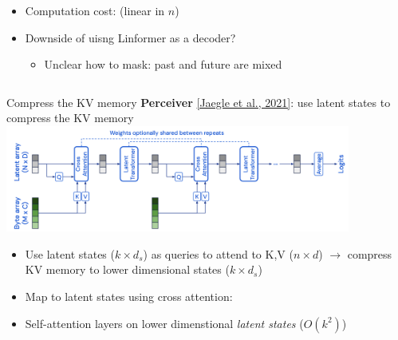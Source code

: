 \documentclass[usenames,dvipsnames,notes,11pt,aspectratio=169,hyperref={colorlinks=true, linkcolor=blue}]{beamer}
\newcommand{\pdfnote}[1]{}
\begin{document}
\begin{frame}
\begin{columns}
\begin{column}{0.7\textwidth}
\begin{itemize}[<+->]
\begin{itemize}
                        \item What's the dimension of the attention matrix?
                            \pdfnote{n x k}
                        \item What's the dimension of the self-attention output?
                            \pdfnote{n x d}
                    \end{itemize}
                \item Computation cost:  (linear in $n$)
                \item Downside of uisng Linformer as a decoder?
                    \begin{itemize}
                        \item Unclear how to mask: past and future are mixed
                    \end{itemize}
            \end{itemize}
        \end{column}
    \end{columns}
\end{frame}

\begin{frame}
    {Compress the KV memory}
    \textbf{Perceiver} \href{https://arxiv.org/pdf/2103.03206.pdf}{[Jaegle et al., 2021]}: use latent states to compress the KV memory \\[1em]

    \includegraphics[height=3.5cm]{figures/perceiver}

    \begin{itemize}[<+->]
        \item Use latent states ($k\times d_s$) as queries to attend to K,V ($n\times d$) $\longrightarrow$ compress KV memory to lower dimensional states ($k\times d_s$)
        \item Map to latent states using cross attention: 
        \item Self-attention layers on lower dimenstional \textit{latent states} ($O(k^2)$)
    \end{itemize}
\end{frame}
\end{document}
